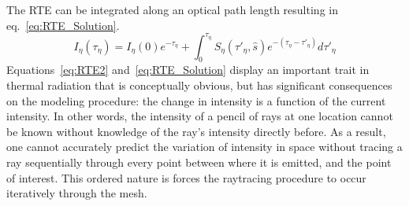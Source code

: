 The RTE can be integrated along an optical path length resulting in eq.~\ref{eq:RTE_Solution}.
\begin{equation}
    I_\eta{}(\tau{}_\eta{}) = I_\eta{}(0)e^{-\tau{}_\eta{}}+\int_{0}^{\tau{}_\eta{}}{S_\eta{}(\tau{}'_\eta{},\hat{s})e^{-(\tau{}_\eta{}-\tau{}'_\eta{})}}d\tau{}'_\eta{}
    \label{eq:RTE_Solution}
\end{equation}
Equations~\ref{eq:RTE2} and~\ref{eq:RTE_Solution} display an important trait in thermal radiation that is conceptually obvious, but has significant consequences on the modeling procedure:
the change in intensity is a function of the current intensity. In other words, the intensity of a pencil of rays at one location cannot be known without knowledge of the ray's intensity directly before.
As a result, one cannot accurately predict the variation of intensity in space without tracing a ray sequentially through every point between where it is emitted, and the point of interest.
This ordered nature is forces the raytracing procedure to occur iteratively through the mesh.

